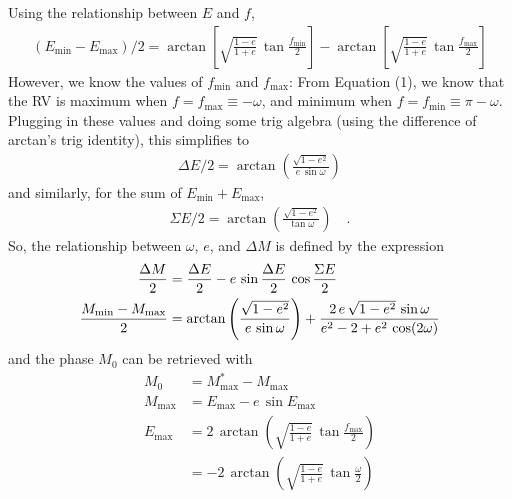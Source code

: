 \documentclass{article}
\begin{document}
Using the relationship between $E$ and $f$,
\begin{align}
    (E_{\mathrm{min}} - E_{\mathrm{max}})/2 =
        \arctan\left[ \sqrt{\frac{1-e}{1+e}} \,
            \tan \frac{f_{\mathrm{min}}}{2} \right] -
        \arctan\left[ \sqrt{\frac{1-e}{1+e}} \,
            \tan \frac{f_{\mathrm{max}}}{2} \right]
\end{align}
However, we know the values of $f_{\mathrm{min}}$ and $f_{\mathrm{max}}$: From
Equation (1), we know that the RV is maximum when $f=f_{\mathrm{max}} \equiv
-\omega$, and minimum when $f=f_{\mathrm{min}} \equiv \pi-\omega$.
Plugging in these values and doing some trig algebra (using the difference of
arctan's trig identity), this simplifies to
\begin{align}
    \Delta E / 2 = \arctan\left(\frac{\sqrt{1 - e^2}}{e\,\sin\omega}\right)
\end{align}
and similarly, for the sum of $E_{\mathrm{min}} + E_{\mathrm{max}}$,
\begin{align}
    \Sigma E / 2 = \arctan\left(\frac{\sqrt{1 - e^2}}{\tan\omega}\right)
        \quad .
\end{align}
So, the relationship between $\omega$, $e$, and $\Delta M$ is defined by the
expression
\begin{align}
    \frac{\Delta M}{2} &= \frac{\Delta E}{2} -
        e\, \sin\frac{\Delta E}{2} \, \cos\frac{\Sigma E}{2} \\
    \frac{M_{\rm min} - M_{\rm max}}{2} &=
        \arctan\left( \frac{\sqrt{1 - e^2}}{e \, \sin\omega} \right) +
        \frac{2\, e \, \sqrt{1 - e^2} \, \sin\omega}{e^2 - 2 + e^2\,\cos(2\omega)}
\end{align}
and the phase $M_0$ can be retrieved with
\begin{align}
    M_0 &= M^*_{\mathrm{max}} - M_{\mathrm{max}} \\
    M_{\mathrm{max}} &= E_{\mathrm{max}} - e \, \sin E_{\mathrm{max}} \\
    E_{\mathrm{max}} &= 2\,\arctan\left(\sqrt{\frac{1-e}{1+e}} \,
        \tan\frac{f_{\mathrm{max}}}{2}\right) \\
    &= -2\,\arctan\left(\sqrt{\frac{1-e}{1+e}} \,
        \tan\frac{\omega}{2}\right) \\
\end{align}
\end{document}

